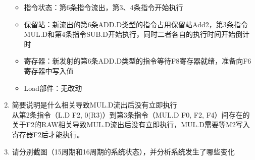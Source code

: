 \documentclass[UTF8]{article}
\begin{document}
\begin{enumerate}
\begin{figure}[H]
{            }
        \end{figure}
        \begin{itemize}
            \item 指令状态：第6条指令流出，第3、4条指令开始执行
            \item 保留站：新流出的第6条ADD.D类型的指令占用保留站Add2，第3条指令MUL.D和第4条指令SUB.D开始执行，同时二者各自的执行时间开始倒计时
            \item 寄存器：新发射的第6条ADD.D类型的指令等待F8寄存器就绪，准备向F6寄存器中写入值
            \item Load部件：无改动
        \end{itemize}
        \item 简要说明是什么相关导致MUL.D流出后没有立即执行 \\
        从第2条指令（{\jetbrains L.D F2, 0(R3)}）到第3条指令（{\jetbrains MUL.D F0, F2, F4}）间存在的关于F2的RAW相关导致MUL.D流出后没有立即执行，MUL.D需要等M2写入寄存器F2后才能执行。
        \item 请分别截图（15周期和16周期的系统状态），并分析系统发生了哪些变化
        \begin{figure}[H]
            \centering
        \end{figure}
        \begin{enumerate}

\end{enumerate}
\end{enumerate}
\end{document}
